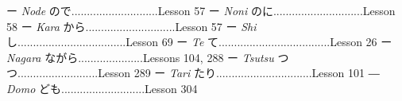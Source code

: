 \begin{itemize}
ー \emph{Node }ので\dothyp{}\dothyp{}\dothyp{}\dothyp{}\dothyp{}\dothyp{}\dothyp{}\dothyp{}\dothyp{}\dothyp{}\dothyp{}\dothyp{}\dothyp{}\dothyp{}\dothyp{}\dothyp{}\dothyp{}\dothyp{}\dothyp{}\dothyp{}\dothyp{}\dothyp{}\dothyp{}\dothyp{}\dothyp{}\dothyp{}\dothyp{}.Lesson 57 \hfill\break
ー \emph{Noni }のに\dothyp{}\dothyp{}\dothyp{}\dothyp{}\dothyp{}\dothyp{}\dothyp{}\dothyp{}\dothyp{}\dothyp{}\dothyp{}\dothyp{}\dothyp{}\dothyp{}\dothyp{}\dothyp{}\dothyp{}\dothyp{}\dothyp{}\dothyp{}\dothyp{}\dothyp{}\dothyp{}\dothyp{}\dothyp{}\dothyp{}\dothyp{}..Lesson 58 \hfill\break
ー \emph{Kara }から\dothyp{}\dothyp{}\dothyp{}\dothyp{}\dothyp{}\dothyp{}\dothyp{}\dothyp{}\dothyp{}\dothyp{}\dothyp{}\dothyp{}\dothyp{}\dothyp{}\dothyp{}\dothyp{}\dothyp{}\dothyp{}\dothyp{}\dothyp{}\dothyp{}\dothyp{}\dothyp{}\dothyp{}\dothyp{}\dothyp{}\dothyp{}..Lesson 57 \hfill\break
ー \emph{Shi }し\dothyp{}\dothyp{}\dothyp{}\dothyp{}\dothyp{}\dothyp{}\dothyp{}\dothyp{}\dothyp{}\dothyp{}\dothyp{}\dothyp{}\dothyp{}\dothyp{}\dothyp{}\dothyp{}\dothyp{}\dothyp{}\dothyp{}\dothyp{}\dothyp{}\dothyp{}\dothyp{}\dothyp{}\dothyp{}\dothyp{}\dothyp{}\dothyp{}\dothyp{}\dothyp{}\dothyp{}\dothyp{}\dothyp{}..Lesson 69 \hfill\break
ー \emph{Te }て\dothyp{}\dothyp{}\dothyp{}\dothyp{}\dothyp{}\dothyp{}\dothyp{}\dothyp{}\dothyp{}\dothyp{}\dothyp{}\dothyp{}\dothyp{}\dothyp{}\dothyp{}\dothyp{}\dothyp{}\dothyp{}\dothyp{}\dothyp{}\dothyp{}\dothyp{}\dothyp{}\dothyp{}\dothyp{}\dothyp{}\dothyp{}\dothyp{}\dothyp{}\dothyp{}\dothyp{}\dothyp{}\dothyp{}\dothyp{}\dothyp{}\dothyp{}Lesson 26 \hfill\break
ー \emph{Nagara }ながら\dothyp{}\dothyp{}\dothyp{}\dothyp{}\dothyp{}\dothyp{}\dothyp{}\dothyp{}\dothyp{}\dothyp{}\dothyp{}\dothyp{}\dothyp{}\dothyp{}\dothyp{}\dothyp{}\dothyp{}\dothyp{}\dothyp{}\dothyp{}\dothyp{}Lessons 104, 288 \hfill\break
ー \emph{Tsutsu }つつ\dothyp{}\dothyp{}\dothyp{}\dothyp{}\dothyp{}\dothyp{}\dothyp{}\dothyp{}\dothyp{}\dothyp{}\dothyp{}\dothyp{}\dothyp{}\dothyp{}\dothyp{}\dothyp{}\dothyp{}\dothyp{}\dothyp{}\dothyp{}\dothyp{}\dothyp{}\dothyp{}\dothyp{}..Lesson 289 \hfill\break
ー \emph{Tari }たり\dothyp{}\dothyp{}\dothyp{}\dothyp{}\dothyp{}\dothyp{}\dothyp{}\dothyp{}\dothyp{}\dothyp{}\dothyp{}\dothyp{}\dothyp{}\dothyp{}\dothyp{}\dothyp{}\dothyp{}\dothyp{}\dothyp{}\dothyp{}\dothyp{}\dothyp{}\dothyp{}\dothyp{}\dothyp{}\dothyp{}\dothyp{}\dothyp{}\dothyp{}\dothyp{}.Lesson 101 \hfill\break
― \emph{Domo }ども\dothyp{}\dothyp{}\dothyp{}\dothyp{}\dothyp{}\dothyp{}\dothyp{}\dothyp{}\dothyp{}\dothyp{}\dothyp{}\dothyp{}\dothyp{}\dothyp{}\dothyp{}\dothyp{}\dothyp{}\dothyp{}\dothyp{}\dothyp{}\dothyp{}\dothyp{}\dothyp{}\dothyp{}\dothyp{}\dothyp{}\dothyp{}Lesson 304 \hfill\break
\hfill\break


\end{itemize}
